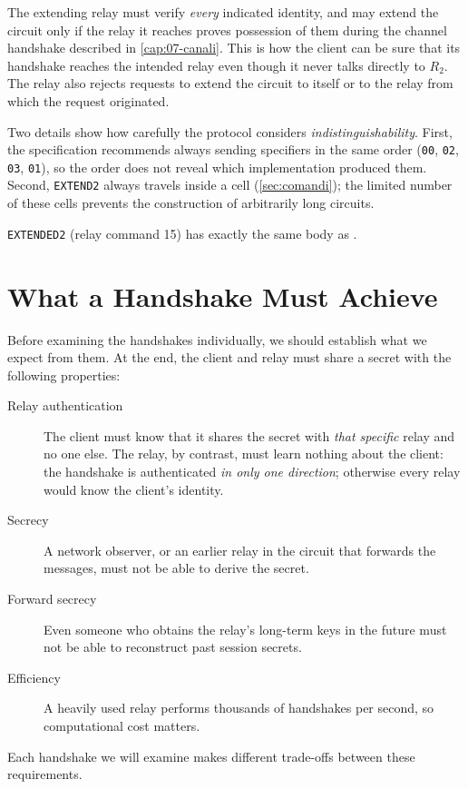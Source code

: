 The extending relay must verify \emph{every} indicated identity, and may extend the circuit only if the relay it reaches proves possession of them during the channel handshake described in \cref{cap:07-canali}. This is how the client can be sure that its handshake reaches the intended relay even though it never talks directly to $R_2$. The relay also rejects requests to extend the circuit to itself or to the relay from which the request originated.

Two details show how carefully the protocol considers \emph{indistinguishability}. First, the specification recommends always sending specifiers in the same order (\texttt{00}, \texttt{02}, \texttt{03}, \texttt{01}), so the order does not reveal which implementation produced them. Second, \texttt{EXTEND2} always travels inside a  cell (\cref{sec:comandi}); the limited number of these cells prevents the construction of arbitrarily long circuits.

\texttt{EXTENDED2} (relay command 15) has exactly the same body as .

\section{What a Handshake Must Achieve}\label{sec:circ-requisiti}

Before examining the handshakes individually, we should establish what we expect from them. At the end, the client and relay must share a secret with the following properties:
\begin{description}
  \item[Relay authentication] The client must know that it shares the secret with \emph{that specific} relay and no one else. The relay, by contrast, must learn nothing about the client: the handshake is authenticated \emph{in only one direction}; otherwise every relay would know the client's identity.
  \item[Secrecy] A network observer, or an earlier relay in the circuit that forwards the messages, must not be able to derive the secret.
  \item[Forward secrecy] Even someone who obtains the relay's long-term keys in the future must not be able to reconstruct past session secrets.
  \item[Efficiency] A heavily used relay performs thousands of handshakes per second, so computational cost matters.
\end{description}
Each handshake we will examine makes different trade-offs between these requirements.

